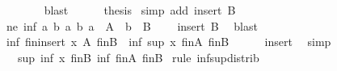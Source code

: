 \begin{isabellebody}
\ \ \ \ \ \ \isamarkupfalse%
\ blast\isanewline
\ \ \ \ \isamarkupfalse%
\ {\isacharquery}{\kern0pt}thesis\ \isamarkupfalse%
{\isacharparenleft}{\kern0pt}simp\ add{\isacharcolon}{\kern0pt}\ insert{\isacharparenleft}{\kern0pt}{}{\isacharparenright}{\kern0pt}\ B{\isacharparenleft}{\kern0pt}{}{\isacharparenright}{\kern0pt}{\isacharparenright}{\kern0pt}\isanewline
\ \ \isamarkupfalse%
\isanewline
\ \ \isamarkupfalse%
\ ne{\isacharcolon}{\kern0pt}\ {\isachardoublequoteopen}{\isacharbraceleft}{\kern0pt}inf\ a\ b\ {\isacharbar}{\kern0pt}a\ b{\isachardot}{\kern0pt}\ a\ {\isasymin}\ A\ {\isasymand}\ b\ {\isasymin}\ B{\isacharbraceright}{\kern0pt}\ {\isasymnoteq}\ {\isacharbraceleft}{\kern0pt}{\isacharbraceright}{\kern0pt}{\isachardoublequoteclose}\ \isamarkupfalse%
\ insert\ B\ \isamarkupfalse%
\ blast\isanewline
\ \ \isamarkupfalse%
\ {\isachardoublequoteopen}inf\ {\isacharparenleft}{\kern0pt}{\isasymSqunion}\isactrlsub f\isactrlsub i\isactrlsub n{\isacharparenleft}{\kern0pt}insert\ x\ A{\isacharparenright}{\kern0pt}{\isacharparenright}{\kern0pt}\ {\isacharparenleft}{\kern0pt}{\isasymSqunion}\isactrlsub f\isactrlsub i\isactrlsub nB{\isacharparenright}{\kern0pt}\ {\isacharequal}{\kern0pt}\ inf\ {\isacharparenleft}{\kern0pt}sup\ x\ {\isacharparenleft}{\kern0pt}{\isasymSqunion}\isactrlsub f\isactrlsub i\isactrlsub nA{\isacharparenright}{\kern0pt}{\isacharparenright}{\kern0pt}\ {\isacharparenleft}{\kern0pt}{\isasymSqunion}\isactrlsub f\isactrlsub i\isactrlsub nB{\isacharparenright}{\kern0pt}{\isachardoublequoteclose}\isanewline
\ \ \ \ \isamarkupfalse%
\ insert\ \isamarkupfalse%
\ simp\isanewline
\ \ \isamarkupfalse%
\ \isamarkupfalse%
\ {\isachardoublequoteopen}{\isasymdots}\ {\isacharequal}{\kern0pt}\ sup\ {\isacharparenleft}{\kern0pt}inf\ x\ {\isacharparenleft}{\kern0pt}{\isasymSqunion}\isactrlsub f\isactrlsub i\isactrlsub nB{\isacharparenright}{\kern0pt}{\isacharparenright}{\kern0pt}\ {\isacharparenleft}{\kern0pt}inf\ {\isacharparenleft}{\kern0pt}{\isasymSqunion}\isactrlsub f\isactrlsub i\isactrlsub nA{\isacharparenright}{\kern0pt}\ {\isacharparenleft}{\kern0pt}{\isasymSqunion}\isactrlsub f\isactrlsub i\isactrlsub nB{\isacharparenright}{\kern0pt}{\isacharparenright}{\kern0pt}{\isachardoublequoteclose}\ \isamarkupfalse%
{\isacharparenleft}{\kern0pt}rule\ inf{\isacharunderscore}{\kern0pt}sup{\isacharunderscore}{\kern0pt}distrib{}{\isacharparenright}{\kern0pt}\isanewline

\end{isabellebody}
